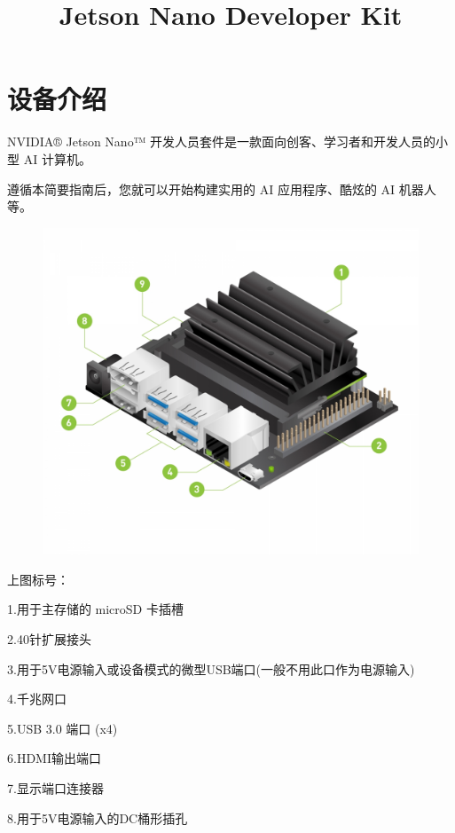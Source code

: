 \documentclass[openbib]{article}
\begin{document}
	\title{Jetson Nano Developer Kit}
	
	\maketitle
	
	\newpage
	\tableofcontents
	\newpage
	
\section{设备介绍}
NVIDIA® Jetson Nano™ 开发人员套件是一款面向创客、学习者和开发人员的小型 AI 计算机。

遵循本简要指南后，您就可以开始构建实用的 AI 应用程序、酷炫的 AI 机器人等。
\begin{figure}[htbp]
	\centering
	\includegraphics[scale=0.4]{1}
\end{figure}	

上图标号：

1.用于主存储的 microSD 卡插槽

2.40针扩展接头

3.用于5V电源输入或设备模式的微型USB端口(一般不用此口作为电源输入)

4.千兆网口

5.USB 3.0 端口 (x4)

6.HDMI输出端口

7.显示端口连接器

8.用于5V电源输入的DC桶形插孔
\end{document}
